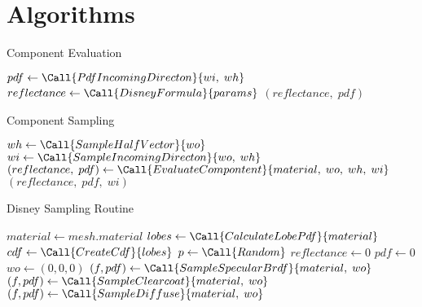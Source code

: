 \chapter{Algorithms}

\begin{algorithm}
    \caption{Component Evaluation}
    \label{alg:component-evaluation}
    \begin{algorithmic}[1]
        \State $pdf \leftarrow \Call{PdfIncomingDirecton}{wi,\;wh}$
        \State $reflectance \leftarrow \Call{DisneyFormula}{params}$
        \State
        \Return $(reflectance,\;pdf)$
        \EndProcedure
    \end{algorithmic}
\end{algorithm}

\begin{algorithm}
    \caption{Component Sampling}
    \label{alg:component-sampling}
    \begin{algorithmic}[1]
        \State $wh \leftarrow \Call{SampleHalfVector}{wo}$
        \State $wi \leftarrow \Call{SampleIncomingDirecton}{wo,\;wh}$
        \State $(reflectance,\;pdf) \leftarrow \Call{EvaluateCompontent}{material,\;wo,\;wh,\;wi}$
        \State
        \Return $(reflectance,\;pdf,\;wi)$
        \EndProcedure
    \end{algorithmic}
\end{algorithm}

\begin{algorithm}
    \caption{Disney Sampling Routine}
    \label{alg:disney-sampling}
    \begin{algorithmic}[1] %
            \State $material \gets mesh.material$ 
            \State $lobes \gets \Call{CalculateLobePdf}{material}$
            \State $cdf \gets \Call{CreateCdf}{lobes}$
            \State $p \gets \Call{Random}$
            \State
            \State $reflectance \gets 0$
            \State $pdf \gets 0$
            \State $wo \gets (0,0,0)$
                \State $(f, pdf) \gets \Call{SampleSpecularBrdf}{material,\;wo}$
                \State $(f, pdf) \gets \Call{SampleClearcoat}{material,\;wo}$
                \State $(f, pdf) \gets \Call{SampleDiffuse}{material,\;wo}$
    \end{algorithmic}
\end{algorithm}

